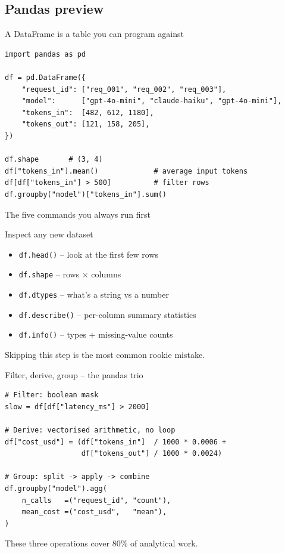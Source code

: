 \documentclass[aspectratio=169,11pt]{beamer}
\begin{document}
\subsection{Pandas preview}

\begin{frame}[fragile]{A DataFrame is a table you can program against}
\begin{lstlisting}
import pandas as pd

df = pd.DataFrame({
    "request_id": ["req_001", "req_002", "req_003"],
    "model":      ["gpt-4o-mini", "claude-haiku", "gpt-4o-mini"],
    "tokens_in":  [482, 612, 1180],
    "tokens_out": [121, 158, 205],
})

df.shape       # (3, 4)
df["tokens_in"].mean()             # average input tokens
df[df["tokens_in"] > 500]          # filter rows
df.groupby("model")["tokens_in"].sum()
\end{lstlisting}
\end{frame}

\begin{frame}{The five commands you always run first}
  \begin{block}{Inspect any new dataset}
    \begin{itemize}
      \item \texttt{df.head()} -- look at the first few rows
      \item \texttt{df.shape} -- rows $\times$ columns
      \item \texttt{df.dtypes} -- what's a string vs a number
      \item \texttt{df.describe()} -- per-column summary statistics
      \item \texttt{df.info()} -- types + missing-value counts
    \end{itemize}
  \end{block}
  Skipping this step is the most common rookie mistake.
\end{frame}

\begin{frame}[fragile]{Filter, derive, group -- the pandas trio}
\begin{lstlisting}
# Filter: boolean mask
slow = df[df["latency_ms"] > 2000]

# Derive: vectorised arithmetic, no loop
df["cost_usd"] = (df["tokens_in"]  / 1000 * 0.0006 +
                  df["tokens_out"] / 1000 * 0.0024)

# Group: split -> apply -> combine
df.groupby("model").agg(
    n_calls   =("request_id", "count"),
    mean_cost =("cost_usd",   "mean"),
)
\end{lstlisting}
  These three operations cover 80\% of analytical work.
\end{frame}
\end{document}
